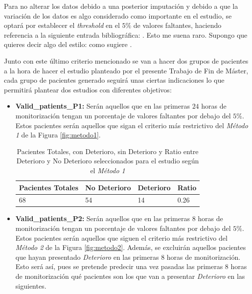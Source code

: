 Para no alterar los datos debido a una posterior imputación y debido a que la variación de los datos es algo considerado como importante en el estudio, se optará por establecer el \textit{threshold} en el $5 \%$ de valores faltantes, {\color{red} haciendo referencia a la siguiente entrada bibliográfica: \cite{Scheffer2002}.} {\color{blue} Esto me suena raro. Supongo que quieres decir algo del estilo: como sugiere \cite{Scheffer2002}.} 

Junto con este último criterio mencionado se van a hacer dos grupos de pacientes a la hora de hacer el estudio planteado por el presente Trabajo de Fin de Máster, cada grupo de pacientes generado seguirá unas ciertas indicaciones lo que permitirá plantear dos estudios con diferentes objetivos:

\begin{itemize}
    \item \textbf{Valid\_patients\_P1:} Serán aquellos que en las primeras $24$ horas de monitorización tengan un porcentaje de valores faltantes por debajo del $5\%$. Estos pacientes serán aquellos que sigan el criterio más restrictivo del \textit{Método 1} de la Figura \ref{fig:metodo1}. 
    \begin{table}[H]
        \centering
        \begin{tabular}{|m{3cm}|m{2.25cm}|m{2cm}|m{2cm}|}
        \hline
            Pacientes Totales & No Deterioro & Deterioro & Ratio \\ \hline
            68 & 54 & 14 & 0.26 \\ \hline
        \end{tabular}
        \caption{Pacientes Totales, con Deterioro, sin Deterioro y Ratio entre Deterioro y No Deterioro seleccionados para el estudio según el \textit{Método 1}}\label{tabla:ratio-deterioro-P1}
    \end{table}
    \item \textbf{Valid\_patients\_P2:} Serán aquellos que en las primeras $8$ horas de monitorización tengan un porcentaje de valores faltantes por debajo del $5\%$. Estos pacientes serán aquellos que siguen el criterio más restrictivo del \textit{Método 2} de la Figura \ref{fig:metodo2}. Además, se excluirán aquellos pacientes que hayan presentado \textit{Deterioro} en las primeras $8$ horas de monitorización. Esto será así, pues se pretende predecir una vez pasadas las primeras $8$ horas de monitorización qué pacientes son los que van a presentar \textit{Deterioro} en las siguientes.
    \begin{table}[H]

\end{table}
\end{itemize}
